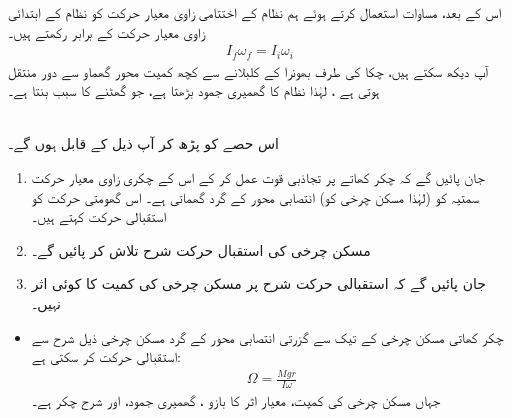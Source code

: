  اس کے بعد، مساوات     استعمال کرتے ہوئے ہم نظام کے اختتامی زاوی معیار حرکت   کو نظام کے ابتدائی زاوی معیار حرکت    کے برابر رکھتے ہیں۔
 \begin{align*}
 I_f\omega_f=I_i\omega_i
 \end{align*}
 آپ دیکھ سکتے ہیں، چکا کی طرف بھونرا کے  کلبلانے سے کچھ کمیت  محور گھماو سے دور منتقل ہوتی ہے ،  لہٰذا نظام کا گھمیری جمود بڑھتا  ہے، جو  گھٹنے کا سبب بنتا ہے۔
 
\\
اس حصے کو پڑھ کر آپ ذیل کے قابل ہوں گے۔
\begin{enumerate}[1.]
\item
جان پائیں گے کہ  چکر  کھاتے  پر تجاذبی قوت عمل کر کے اس کے  چکری زاوی  معیار حرکت سمتیہ  کو (لہٰذا مسکن چرخی کو)  انتصابی محور کے گرد گھماتی ہے۔  اس گھومتی حرکت کو استقبالی حرکت کہتے ہیں۔
\item
مسکن چرخی کی استقبال حرکت شرح تلاش کر پائیں گے۔
\item
جان پائیں گے کہ استقبالی حرکت شرح پر مسکن چرخی کی کمیت کا کوئی اثر نہیں۔
\end{enumerate}

\begin{itemize}
\item
چکر کھاتی مسکن چرخی کے     تیک  سے گزرتی انتصابی محور  کے گرد مسکن چرخی ذیل شرح سے استقبالی حرکت کر سکتی ہے:
\begin{align*}
\Omega=\frac{Mgr}{I\omega}
\end{align*}
جہاں  مسکن چرخی کی کمیت،   معیار اثر کا  بازو ،  گھمیری جمود، اور   شرح چکر  ہے۔
\end{itemize}


